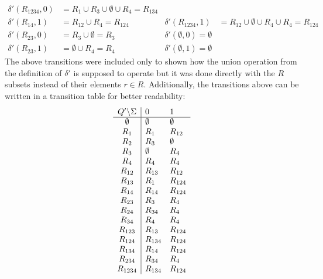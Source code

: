 \begin{solution}
\begin{align*}
            \delta'(R_{1234}, 0) & = R_{1} \cup R_{3} \cup \emptyset \cup R_{4}= R_{134} \\
        \delta'(R_{14}, 1) & = R_{12} \cup R_{4} = R_{124} & %
            \delta'(R_{1234}, 1) & = R_{12} \cup \emptyset \cup R_{4} \cup R_{4} = R_{124} \\
        \delta'(R_{23}, 0) & = R_{3} \cup \emptyset = R_{3} & %
            \delta'(\emptyset, 0) = \emptyset \\
        \delta'(R_{23}, 1) & = \emptyset \cup R_{4} = R_{4} & %
            \delta'(\emptyset, 1) = \emptyset
    \end{align*}
    The above transitions were included only to shown how the union operation from the definition of $\delta'$ is supposed to operate but it was done directly with the $R$ subsets instead of their elements $r \in R$. Additionally, the transitions above can be written in a transition table for better readability:
    \begin{equation*}
        \begin{array}{c | l l}
            Q' \backslash \Sigma & 0 & 1 \\
            \hline
            \emptyset & \emptyset & \emptyset \\
            R_{1} & R_{1} & R_{12} \\
            R_{2} & R_{3} & \emptyset \\
            R_{3} & \emptyset & R_{4} \\
            R_{4} & R_{4} & R_{4} \\
            R_{12} & R_{13} & R_{12} \\
            R_{13} & R_{1} & R_{124} \\
            R_{14} & R_{14} & R_{124} \\
            R_{23} & R_{3} & R_{4} \\
            R_{24} & R_{34} & R_{4} \\
            R_{34} & R_{4} & R_{4} \\
            R_{123} & R_{13} & R_{124} \\
            R_{124} & R_{134} & R_{124} \\
            R_{134} & R_{14} & R_{124} \\
            R_{234} & R_{34} & R_{4} \\
            R_{1234} & R_{134} & R_{124}
        \end{array}
    \end{equation*}


\end{solution}
